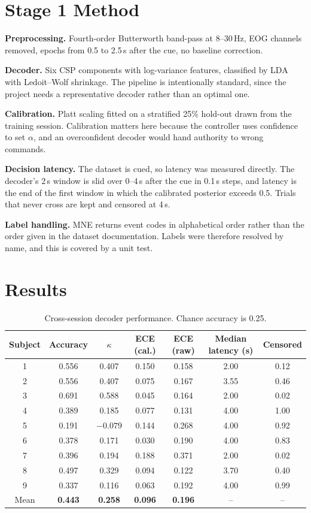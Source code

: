 \documentclass[11pt,a4paper]{article}
\begin{document}
\section{Stage 1 Method}

\textbf{Preprocessing.} Fourth-order Butterworth band-pass at 8--30\,Hz, EOG
channels removed, epochs from 0.5 to 2.5\,s after the cue, no baseline
correction.

\textbf{Decoder.} Six CSP components with log-variance features, classified by
LDA with Ledoit--Wolf shrinkage. The pipeline is intentionally standard, since
the project needs a representative decoder rather than an optimal one.

\textbf{Calibration.} Platt scaling fitted on a stratified 25\% hold-out drawn
from the training session. Calibration matters here because the controller
uses confidence to set $\alpha$, and an overconfident decoder would hand
authority to wrong commands.

\textbf{Decision latency.} The dataset is cued, so latency was measured
directly. The decoder's 2\,s window is slid over 0--4\,s after the cue in
0.1\,s steps, and latency is the end of the first window in which the
calibrated posterior exceeds 0.5. Trials that never cross are kept and
censored at 4\,s.

\textbf{Label handling.} MNE returns event codes in alphabetical order rather
than the order given in the dataset documentation. Labels were therefore
resolved by name, and this is covered by a unit test.

\section{Results}

\begin{table}[h]
\centering
\small
\caption{Cross-session decoder performance. Chance accuracy is 0.25.}
\label{tab:res}
\begin{tabular}{ccccccc}
\toprule
Subject & Accuracy & $\kappa$ & ECE (cal.) & ECE (raw) & Median latency (s) & Censored \\
\midrule
1 & 0.556 & 0.407 & 0.150 & 0.158 & 2.00 & 0.12 \\
2 & 0.556 & 0.407 & 0.075 & 0.167 & 3.55 & 0.46 \\
3 & 0.691 & 0.588 & 0.045 & 0.164 & 2.00 & 0.02 \\
4 & 0.389 & 0.185 & 0.077 & 0.131 & 4.00 & 1.00 \\
5 & 0.191 & $-0.079$ & 0.144 & 0.268 & 4.00 & 0.92 \\
6 & 0.378 & 0.171 & 0.030 & 0.190 & 4.00 & 0.83 \\
7 & 0.396 & 0.194 & 0.188 & 0.371 & 2.00 & 0.02 \\
8 & 0.497 & 0.329 & 0.094 & 0.122 & 3.70 & 0.40 \\
9 & 0.337 & 0.116 & 0.063 & 0.192 & 4.00 & 0.99 \\
\midrule
Mean & \textbf{0.443} & \textbf{0.258} & \textbf{0.096} & \textbf{0.196} & -- & -- \\
\bottomrule
\end{tabular}
\end{table}
\end{document}
